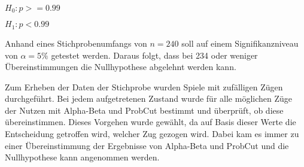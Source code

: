 \hspace*{1.3cm}
$H_0:p>=0.99$

\hspace*{1.3cm}
$H_1:p<0.99$

Anhand eines Stichprobenumfangs von $n=240$ soll auf einem Signifikanzniveau von $\alpha=5\%$ getestet werden. Daraus
folgt, dass bei 234 oder weniger Übereinstimmungen die Nullhypothese abgelehnt werden kann.

Zum Erheben der Daten der Stichprobe wurden Spiele mit zufälligen Zügen durchgeführt. Bei jedem aufgetretenen Zustand
wurde für alle möglichen Züge der Nutzen mit Alpha-Beta und ProbCut bestimmt und überprüft, ob diese übereinstimmen.
Dieses Vorgehen wurde gewählt, da auf Basis dieser Werte die Entscheidung getroffen wird, welcher Zug gezogen wird.
Dabei kam es immer zu einer Übereinstimmung der Ergebnisse von Alpha-Beta und ProbCut und die Nullhypothese kann
angenommen werden.
